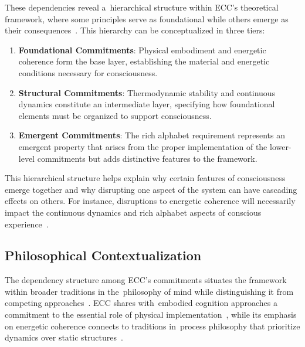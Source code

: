 These dependencies reveal a~hierarchical structure within ECC's theoretical framework, where some principles serve as foundational while others emerge as their consequences~\cite{mossio2015biological,difrisco2014hylomorphism}. This hierarchy can be conceptualized in three tiers:

\begin{enumerate}
    \item \textbf{Foundational Commitments}: Physical embodiment and energetic coherence form the base layer, establishing the material and energetic conditions necessary for consciousness.

    \item \textbf{Structural Commitments}: Thermodynamic stability and continuous dynamics constitute an intermediate layer, specifying how foundational elements must be organized to support consciousness.

    \item \textbf{Emergent Commitments}: The rich alphabet requirement represents an emergent property that arises from the proper implementation of the lower-level commitments but adds distinctive features to the framework.
\end{enumerate}

This hierarchical structure helps explain why certain features of consciousness emerge together and why disrupting one aspect of the system can have cascading effects on others. For instance, disruptions to energetic coherence will necessarily impact the continuous dynamics and rich alphabet aspects of conscious experience~\cite{breakspear2005dynamics,amil2024theta}.

\subsection*{Philosophical Contextualization}

The dependency structure among ECC's commitments situates the framework within broader traditions in the~philosophy of mind while distinguishing it from competing approaches~\cite{chalmers2006strong,seth2021being}. ECC shares with~embodied cognition approaches a commitment to the essential role of physical implementation~\cite{thompson2010mind,noe2009out}, while its emphasis on energetic coherence connects to traditions in~process philosophy that prioritize dynamics over static structures~\cite{whitehead2010process}.

